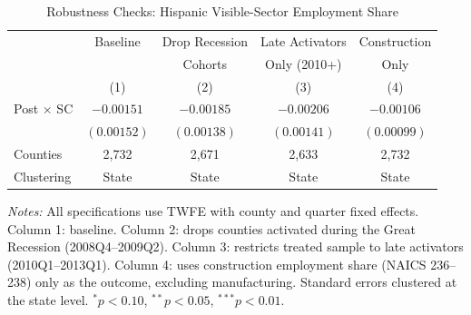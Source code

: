 \begin{table}[htbp]
\centering
\begin{threeparttable}
\caption{Robustness Checks: Hispanic Visible-Sector Employment Share}
\label{tab:robust}
\begin{tabular}{lcccc}
\toprule
 & Baseline & Drop Recession & Late Activators & Construction \\
 &  & Cohorts & Only (2010+) & Only \\
 & (1) & (2) & (3) & (4) \\
\midrule
Post $\times$ SC & $-0.00151$ & $-0.00185$ & $-0.00206$ & $-0.00106$ \\
 & $(0.00152)$ & $(0.00138)$ & $(0.00141)$ & $(0.00099)$ \\
\addlinespace
Counties & 2,732 & 2,671 & 2,633 & 2,732 \\
Clustering & State & State & State & State \\
\bottomrule
\end{tabular}
\begin{tablenotes}[flushleft]
\small
\item \textit{Notes:} All specifications use TWFE with county and quarter fixed effects. Column 1: baseline. Column 2: drops counties activated during the Great Recession (2008Q4--2009Q2). Column 3: restricts treated sample to late activators (2010Q1--2013Q1). Column 4: uses construction employment share (NAICS 236--238) only as the outcome, excluding manufacturing. Standard errors clustered at the state level. $^{*}p<0.10$, $^{**}p<0.05$, $^{***}p<0.01$.
\end{tablenotes}
\end{threeparttable}
\end{table}
